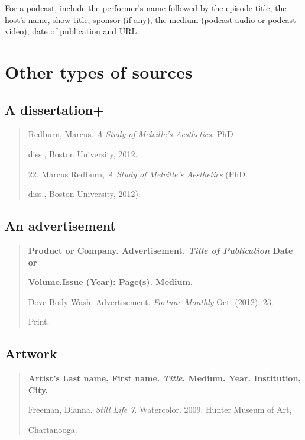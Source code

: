  For a podcast, include the performer's name followed by the episode title, the host's name, show title, sponsor (if any), the medium (podcast audio or podcast video), date of publication and URL.

\section{Other types of sources}

\subsection{A dissertation+}

\begin{quote}

Redburn, Marcus. \emph{A Study of Melville's Aesthetics}. PhD

\hspace{.4in} diss., Boston University, 2012.

\medskip

\hspace{.4in}22. Marcus Redburn, \emph{A Study of Melville's Aesthetics} (PhD 

diss., Boston University, 2012).

\end{quote}


\subsection{An advertisement}

\begin{quote}
\textbf{Product or Company. Advertisement. \emph{Title of Publication} Date or}

\hspace{.4in}\textbf{Volume.Issue (Year): Page(s). Medium.}

\medskip

Dove Body Wash. Advertisement. \emph{Fortune Monthly} Oct. (2012): 23. 

\hspace{.4in}Print.


\end{quote}



\subsection{Artwork}

\begin{quote} 

\textbf{Artist's Last name, First name. \emph{Title}. Medium. Year. Institution, City.}

\medskip

Freeman, Dianna. \emph{Still Life 7}. Watercolor. 2009. Hunter Museum of Art, 

\hspace{.4in}Chattanooga.

\end{quote}

